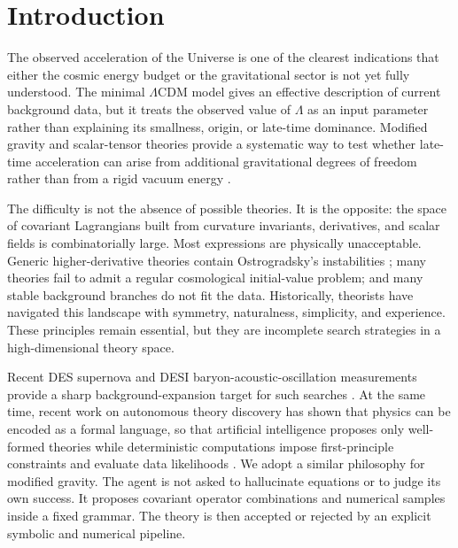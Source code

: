 \documentclass[aps,prd,twocolumn,superscriptaddress,nofootinbib,longbibliography]{revtex4-2}
\begin{document}
\maketitle

\section{Introduction}
\label{sec:introduction}

The observed acceleration of the Universe is one of the clearest indications that either the cosmic energy budget or the gravitational sector is not yet fully understood. The minimal $\Lambda$CDM model gives an effective description of current background data, but it treats the observed value of $\Lambda$ as an input parameter rather than explaining its smallness, origin, or late-time dominance. Modified gravity and scalar-tensor theories provide a systematic way to test whether late-time acceleration can arise from additional gravitational degrees of freedom rather than from a rigid vacuum energy \cite{Clifton2012,SotiriouFaraoni2010,Horndeski1974}.

The difficulty is not the absence of possible theories. It is the opposite: the space of covariant Lagrangians built from curvature invariants, derivatives, and scalar fields is combinatorially large.  Most expressions are physically unacceptable. Generic higher-derivative theories contain Ostrogradsky's instabilities \cite{Ostrogradsky1850}; many theories fail to admit a regular cosmological initial-value problem; and many stable background branches do not fit the data. Historically, theorists have navigated this landscape with symmetry, naturalness, simplicity, and experience. These principles remain essential, but they are incomplete search strategies in a high-dimensional theory space.

Recent DES supernova and DESI baryon-acoustic-oscillation measurements provide a sharp background-expansion target for such searches \cite{DES2024SN,DESI2025BAO}.  At the same time, recent work on autonomous theory discovery has shown that physics can be encoded as a formal language, so that artificial intelligence proposes only well-formed theories while deterministic computations impose first-principle constraints and evaluate data likelihoods \cite{Alexander2026Albert}.  We adopt a similar philosophy for modified gravity. The agent is not asked to hallucinate equations or to judge its own success. It proposes covariant operator combinations and numerical samples inside a fixed grammar. The theory is then accepted or rejected by an explicit symbolic and numerical pipeline.
\end{document}
